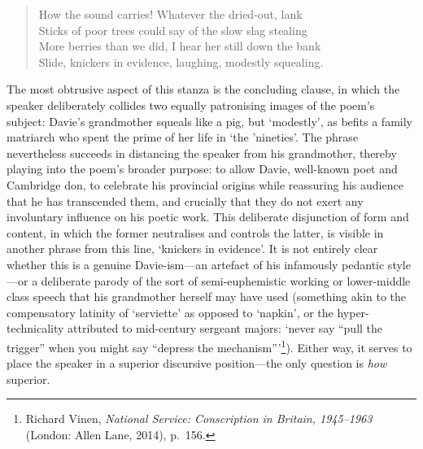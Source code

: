 \documentclass[]{article}
\begin{document}
\begin{quote}
\singlespacing How the sound carries! Whatever the dried-out, lank\\
Sticks of poor trees could say of the slow slag stealing\\
More berries than we did, I hear her still down the bank\\
Slide, knickers in evidence, laughing, modestly squealing.
\end{quote}

\noindent The most obtrusive aspect of this stanza is the concluding
clause, in which the speaker deliberately collides two equally
patronising images of the poem’s subject: Davie’s grandmother squeals
like a pig, but ‘modestly’, as befits a family matriarch who spent the
prime of her life in ‘the ’nineties’. The phrase nevertheless succeeds
in distancing the speaker from his grandmother, thereby playing into the
poem’s broader purpose: to allow Davie, well-known poet and Cambridge
don, to celebrate his provincial origins while reassuring his audience
that he has transcended them, and crucially that they do not exert any
involuntary influence on his poetic work. This deliberate disjunction of
form and content, in which the former neutralises and controls the
latter, is visible in another phrase from this line, ‘knickers in
evidence’. It is not entirely clear whether this is a genuine
Davie-ism—an artefact of his infamously pedantic style—or a deliberate
parody of the sort of semi-euphemistic working or lower-middle class
speech that his grandmother herself may have used (something akin to the
compensatory latinity of ‘serviette’ as opposed to ‘napkin’, or the
hyper-technicality attributed to mid-century sergeant majors: ‘never say
“pull the trigger” when you might say “depress the mechanism”’\footnote{Richard
  Vinen, \emph{National Service: Conscription in Britain, 1945–1963}
  (London: Allen Lane, 2014), p.~156.}). Either way, it serves to place
the speaker in a superior discursive position—the only question is
\emph{how} superior.
\end{document}
